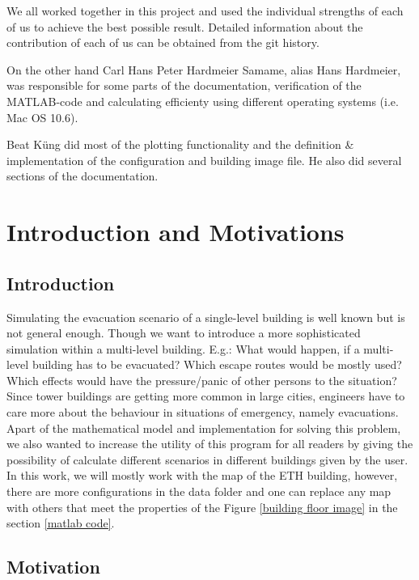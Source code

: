 \documentclass[11pt]{article}
\begin{document}
We all worked together in this project and used the individual strengths of each
of us to achieve the best possible result. Detailed information about the
contribution of each of us can be obtained from the git history.

On the other hand Carl Hans Peter Hardmeier Samame, alias Hans Hardmeier, was 
responsible for some parts of the documentation, verification of the MATLAB-code
and calculating efficienty using different operating systems (i.e. Mac OS 10.6).



Beat K\"ung did most of the plotting functionality and the definition \&
implementation of the configuration and building image file. He also did several
sections of the documentation.




\section{Introduction and Motivations}

\subsection{Introduction}

Simulating the evacuation scenario of a single-level building is well known but
is not general enough. Though we want to introduce a more sophisticated
simulation within a multi-level building. E.g.: What would happen, if a
multi-level building has to be evacuated? Which escape routes would be mostly
used? Which effects would have the pressure/panic of other persons to the
situation? Since tower buildings are getting more common in large cities,
engineers have to care more about the behaviour in situations of emergency,
namely evacuations. Apart of the mathematical model and implementation for
solving this problem, we also wanted to increase the utility of this program for
all readers by giving the possibility of calculate different scenarios in
different buildings given by the user. In this work, we will mostly work with
the map of the ETH building, however, there are more configurations in the data
folder and one can replace any map with others that meet the properties of the
Figure \ref{building floor image} in the section \ref{matlab code}.

\subsection{Motivation}
\end{document}
